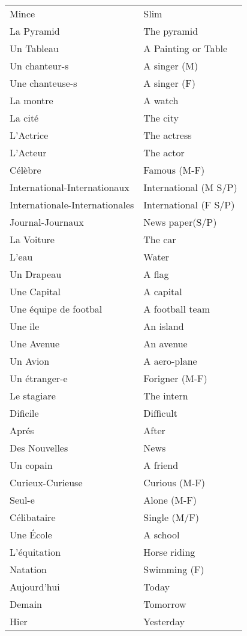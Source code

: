 \begin{longtable}{l  l}
Mince		& Slim		\\
La Pyramid	& The pyramid	\\
Un Tableau	& A Painting or Table	\\
Un chanteur-s	& A singer (M)	\\
Une chanteuse-s	& A singer (F)	\\
La montre	& A watch	\\
La cit\'e	& The city	\\
L'Actrice	& The actress	\\
L'Acteur	& The actor	\\
C\'el\`ebre	& Famous (M-F)	\\
International-Internationaux	& International (M S/P)\\
Internationale-Internationales	& International (F S/P)\\
Journal-Journaux & News paper(S/P)\\ 
La Voiture	& The car	\\
L'eau		& Water		\\ 
Un Drapeau	& A flag	\\
Une Capital	& A capital	\\
Une \'equipe de footbal	& A football team\\
Une ile		& An island	\\
Une Avenue	& An avenue	\\
Un Avion	& A aero-plane	\\
Un \'etranger-e	& Forigner (M-F)\\
Le stagiare	& The intern	\\
Dificile	& Difficult	\\
Apr\'es		& After		\\
Des Nouvelles	& News		\\
Un copain	& A friend	\\
Curieux-Curieuse& Curious (M-F)	\\
Seul-e		& Alone (M-F)	\\
C\'elibataire	& Single (M/F)	\\
Une \'Ecole	& A school	\\
L'\'equitation & Horse riding \\
Natation & Swimming (F) \\
Aujourd'hui & Today \\
Demain & Tomorrow \\
Hier & Yesterday \\
\end{longtable}

